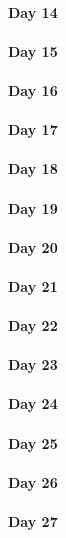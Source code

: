 \documentclass[UTF8,a4paper,8pt]{ctexart}
\begin{document}
 	 \paragraph{Day 14      \quad     }
 	 \paragraph{Day 15      \quad     }
 	 \paragraph{Day 16      \quad     }
 	 \paragraph{Day 17      \quad     }
 	 \paragraph{Day 18      \quad     }
 	 \paragraph{Day 19      \quad     }
 	 \paragraph{Day 20      \quad     }
 	 \paragraph{Day 21      \quad     }
 	 \paragraph{Day 22      \quad     }
 	 \paragraph{Day 23      \quad     }
 	 \paragraph{Day 24      \quad     }
 	 \paragraph{Day 25      \quad     }
 	 \paragraph{Day 26      \quad     }
 	 \paragraph{Day 27      \quad     }
\end{document}
